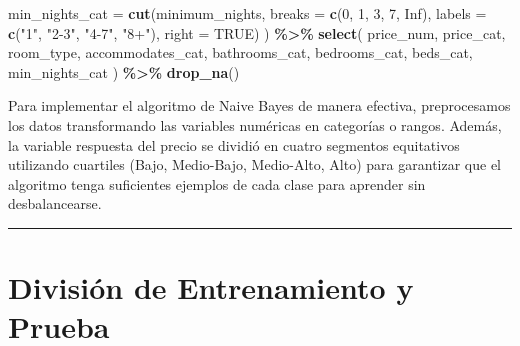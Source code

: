 \documentclass[
]{article}
\newenvironment{Shaded}{\begin{snugshade}}{\end{snugshade}}
\newcommand{\AttributeTok}[1]{\textcolor[rgb]{0.13,0.29,0.53}{#1}}
\newcommand{\CommentTok}[1]{\textcolor[rgb]{0.56,0.35,0.01}{\textit{#1}}}
\newcommand{\ConstantTok}[1]{\textcolor[rgb]{0.56,0.35,0.01}{#1}}
\newcommand{\DecValTok}[1]{\textcolor[rgb]{0.00,0.00,0.81}{#1}}
\newcommand{\FloatTok}[1]{\textcolor[rgb]{0.00,0.00,0.81}{#1}}
\newcommand{\FunctionTok}[1]{\textcolor[rgb]{0.13,0.29,0.53}{\textbf{#1}}}
\newcommand{\NormalTok}[1]{#1}
\newcommand{\OtherTok}[1]{\textcolor[rgb]{0.56,0.35,0.01}{#1}}
\newcommand{\SpecialCharTok}[1]{\textcolor[rgb]{0.81,0.36,0.00}{\textbf{#1}}}
\newcommand{\StringTok}[1]{\textcolor[rgb]{0.31,0.60,0.02}{#1}}
\begin{document}
\begin{Shaded}
\begin{Highlighting}[]
    \AttributeTok{min\_nights\_cat   =} \FunctionTok{cut}\NormalTok{(minimum\_nights, }\AttributeTok{breaks =} \FunctionTok{c}\NormalTok{(}\DecValTok{0}\NormalTok{, }\DecValTok{1}\NormalTok{, }\DecValTok{3}\NormalTok{, }\DecValTok{7}\NormalTok{, }\ConstantTok{Inf}\NormalTok{), }\AttributeTok{labels =} \FunctionTok{c}\NormalTok{(}\StringTok{"1"}\NormalTok{, }\StringTok{"2{-}3"}\NormalTok{, }\StringTok{"4{-}7"}\NormalTok{, }\StringTok{"8+"}\NormalTok{), }\AttributeTok{right =} \ConstantTok{TRUE}\NormalTok{)}
\NormalTok{  ) }\SpecialCharTok{\%\textgreater{}\%}
  \FunctionTok{select}\NormalTok{(}
\NormalTok{    price\_num, price\_cat, room\_type, accommodates\_cat,}
\NormalTok{    bathrooms\_cat, bedrooms\_cat, beds\_cat,}
\NormalTok{    min\_nights\_cat}
\NormalTok{  ) }\SpecialCharTok{\%\textgreater{}\%}
  \FunctionTok{drop\_na}\NormalTok{()}
\end{Highlighting}
\end{Shaded}

Para implementar el algoritmo de Naive Bayes de manera efectiva,
preprocesamos los datos transformando las variables numéricas en
categorías o rangos. Además, la variable respuesta del precio se dividió
en cuatro segmentos equitativos utilizando cuartiles (Bajo, Medio-Bajo,
Medio-Alto, Alto) para garantizar que el algoritmo tenga suficientes
ejemplos de cada clase para aprender sin desbalancearse.

\begin{center}\rule{0.5\linewidth}{0.5pt}\end{center}

\section{División de Entrenamiento y
Prueba}\label{divisiuxf3n-de-entrenamiento-y-prueba}

\begin{Shaded}
\end{Shaded}
\end{document}
